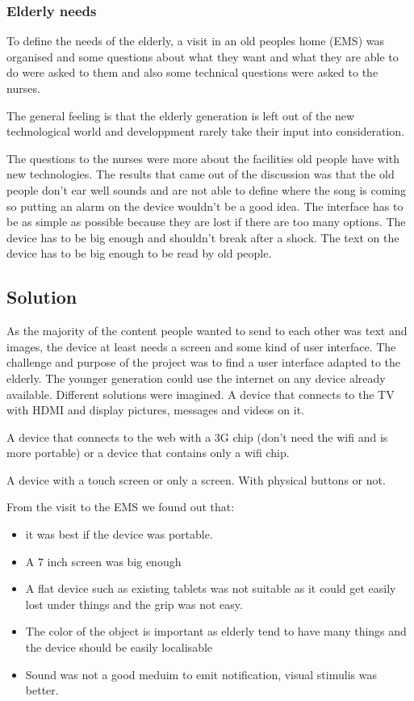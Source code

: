 \subsubsection{Elderly needs}
To define the needs of the elderly, a visit in an old peoples home (EMS) was organised and some questions about what they want and what they are able to do were asked to them and also some technical questions were asked to the nurses.

The general feeling is that the elderly generation is left out of the new technological world and developpment rarely take their input into consideration.

The questions to the nurses were more about the facilities old people have with new technologies. The results that came out of the discussion was that the old people don’t ear well sounds and are not able to define where the song is coming so putting an alarm on the device wouldn’t be a good idea. The interface has to be as simple as possible because they are lost if there are too many options. The device has to be big enough and shouldn’t break after a shock. The text on the device has to be big enough to be read by old people.

\subsection{Solution}
As the majority of the content people wanted to send to each other was text and images, the device at least needs a screen and some kind of user interface.
The challenge and purpose of the project was to find a user interface adapted to the elderly. The younger generation could use the internet on any device already available.
Different solutions were imagined. A device that connects to the TV with HDMI and display pictures, messages and videos on it.

A device that connects to the web with a 3G chip (don’t need the wifi and is more portable) or a device that contains only a wifi chip.

A device with a touch screen or only a screen. With physical buttons or not.

From the visit to the EMS we found out that:
\begin{itemize}
  \item{it was best if the device was portable. }
  \item{ A 7 inch screen was big enough }
  \item{ A flat device such as existing tablets was not suitable as it could get easily lost under things and the grip was not easy.}
  \item{ The color of the object is important as elderly tend to have many things and the device should be easily localisable}
  \item{ Sound was not a good meduim to emit notification, visual stimulis was better.}
\end{itemize}


